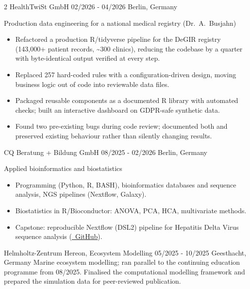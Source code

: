 \documentclass{thejus_cv}
\begin{document}
\begin{paracol}{2}
             {HealthTwiSt GmbH}
             {02/2026 - 04/2026}
             {Berlin, Germany}
             {Production data engineering for a national medical registry (Dr.~A.~Busjahn)
             \begin{itemize}\setlength{\itemsep}{0.05em}
                   \item Refactored a production R/tidyverse pipeline for the DeGIR registry (143,000+ patient records, \textasciitilde300 clinics), reducing the codebase by a quarter with byte-identical output verified at every step.
                   \item Replaced 257 hard-coded rules with a configuration-driven design, moving business logic out of code into reviewable data files.
                   \item Packaged reusable components as a documented R library with automated checks; built an interactive dashboard on GDPR-safe synthetic data.
                   \item Found two pre-existing bugs during code review; documented both and preserved existing behaviour rather than silently changing results.
             \end{itemize}}

             {CQ Beratung + Bildung GmbH}
             {08/2025 - 02/2026}
             {Berlin, Germany}
             {Applied bioinformatics and biostatistics
             \begin{itemize}\setlength{\itemsep}{0.05em}
                 \item Programming (Python, R, BASH), bioinformatics databases and sequence analysis, NGS pipelines (Nextflow, Galaxy).
                 \item Biostatistics in R/Bioconductor: ANOVA, PCA, HCA, multivariate methods.
                 \item Capstone: reproducible Nextflow (DSL2) pipeline for Hepatitis Delta Virus sequence analysis (\href{https://github.com/thejusmahajan/hepatitis-delta-pipeline}{\faGithub\ GitHub}).
             \end{itemize}}
\vspace{1.5em}
             {Helmholtz-Zentrum Hereon, Ecosystem Modelling}
             {05/2025 - 10/2025}
             {Geesthacht, Germany}
             {Marine ecosystem modelling; ran parallel to the continuing education programme from 08/2025. Finalised the computational modelling framework and prepared the simulation data for peer-reviewed publication.}


\end{paracol}
\end{document}
